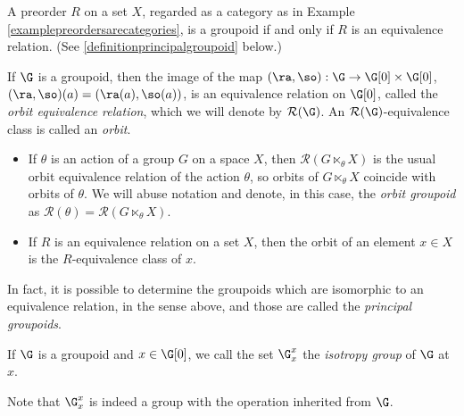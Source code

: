 \begin{example}\label{exampleequivalencerelationsarecategories}
A preorder $R$ on a set $X$, regarded as a category as in Example \ref{examplepreordersarecategories}, is a groupoid if and only if $R$ is an equivalence relation. (See \ref{definitionprincipalgroupoid} below.)
\end{example}

\begin{example}\label{exampleorbitgroupoid}
If $\G$ is a groupoid, then the image of the map $(\ra,\so):\G\to\G[0]\times\G[0]$, $(\ra,\so)(a)=(\ra(a),\so(a))$, is an equivalence relation on $\G[0]$, called the \emph{orbit equivalence relation}, which we will denote by $\mathcal{R}(\G)$. An $\mathcal{R}(\G)$-equivalence class is called an \emph{orbit}.%

\begin{itemize}
\item If $\theta$ is an action of a group $G$ on a space $X$, then $\mathcal{R}(G\ltimes_\theta X)$ is the usual orbit equivalence relation of the action $\theta$, so orbits of $G\ltimes_\theta X$ coincide with orbits of $\theta$. We will abuse notation and denote, in this case, the \emph{orbit groupoid} as $\mathcal{R}(\theta)=\mathcal{R}(G\ltimes_\theta X)$.
\item If $R$ is an equivalence relation on a set $X$, then the orbit of an element $x\in X$ is the $R$-equivalence class of $x$.
\end{itemize}
\end{example}

In fact, it is possible to determine the groupoids which are isomorphic to an equivalence relation, in the sense above, and those are called the \emph{principal groupoids}.

\begin{definition}\label{definitionisotropygroup}
If $\G$ is a groupoid and $x\in\G[0]$, we call the set $\G_x^x$ the \emph{isotropy group} of $\G$ at $x$.
\end{definition}

Note that $\G_x^x$ is indeed a group with the operation inherited from $\G$.

